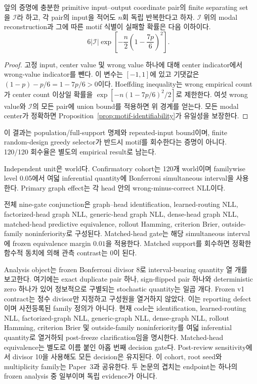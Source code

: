 \begin{corollary}[반복 input 회수 경계]
\label{cor:motif-recovery-bound}
앞의 증명에 충분한 primitive input--output coordinate pair의 finite separating
set을 \(\mathcal I\)라 하고, 각 pair의 input을 적어도 \(n\)회 독립 반복한다고 하자.
\(\mathcal I\) 위의 modal reconstruction과 그에 따른 motif 식별이 실패할 확률은
다음 이하이다.
\[
  6|\mathcal I|\exp\!\left[
    -\frac{n}{2}\left(1-\frac{7p}{6}\right)^2
  \right].
\]
\end{corollary}
\begin{proof}
고정 input, center value 및 wrong value 하나에 대해 center indicator에서 wrong-value
indicator를 뺀다. 이 변수는 \([-1,1]\)에 있고 기댓값은
\((1-p)-p/6=1-7p/6>0\)이다. Hoeffding inequality는 wrong empirical count가 center
count 이상일 확률을 \(\exp[-n(1-7p/6)^2/2]\)로 제한한다. 여섯 wrong value와
\(\mathcal I\)의 모든 pair에 union bound를 적용하면 위 경계를 얻는다. 모든 modal
center가 정확하면 Proposition~\ref{prop:motif-identifiability}가 유일성을 보장한다.
\end{proof}

이 결과는 population/full-support 명제와 repeated-input bound이며, finite
random-design greedy selector가 반드시 motif를 회수한다는 증명이 아니다. 120/120
회수율은 별도의 empirical result로 남는다.

Independent unit은 world다. Confirmatory cohort는 120개 world이며 familywise level
0.05에서 여덟 inferential quantity에 Bonferroni simultaneous interval을 사용한다.
Primary graph effect는 각 head 안의 wrong-minus-correct NLL이다.

전체 nine-gate conjunction은 graph--head identification, learned-routing NLL,
factorized-head graph NLL, generic-head graph NLL, dense-head graph NLL,
matched-head predictive equivalence, rollout Hamming, criterion Brier,
outside-family noninferiority로 구성된다. Matched-head gate는 해당 simultaneous
interval에 frozen equivalence margin $0.01$을 적용한다. Matched support를
회수하면 정확한 함수적 동치에 의해 관측 contrast는 0이 된다.

Analysis object는 frozen Bonferroni divisor 8로 interval-bearing quantity 열 개를
보고한다. 여기에는 exact duplicate pair 하나, sign-flipped pair 하나와 deterministic
zero 하나가 있어 정보적으로 구별되는 stochastic quantity는 일곱 개다. Frozen v1
contract는 정수 divisor만 지정하고 구성원을 열거하지 않았다. 이는 reporting
defect이며 사전등록된 family 정의가 아니다. 현재 code는 identification,
learned-routing NLL, factorized-graph NLL, generic-graph NLL, dense-graph NLL,
rollout Hamming, criterion Brier 및 outside-family noninferiority를 여덟
inferential quantity로 열거하되 post-freeze clarification임을 명시한다.
Matched-head equivalence는 별도로 이름 붙인 아홉 번째 decision gate다. Post-review
sensitivity에서 divisor 10을 사용해도 모든 decision은 유지된다. 이 cohort, root
seed와 multiplicity family는 Paper~3과 공유한다. 두 논문의 겹치는 endpoint는 하나의
frozen analysis 중 일부이며 독립 evidence가 아니다.

